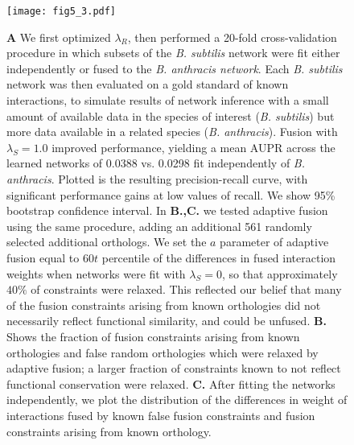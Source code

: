 \documentclass[11pt]{article}
\begin{document}
\pagebreak

\begin{figure}
\begin{center}
  \texttt{[image: fig5\_3.pdf]}
  \caption{\label{xspecies-real} \textbf{A} We first optimized $\lambda_R$, then performed a 20-fold cross-validation procedure in which subsets of the \textit{B. subtilis} network were fit either independently or fused to the \textit{B. anthracis network}. Each \textit{B. subtilis} network was then evaluated on a gold standard of known interactions, to simulate results of network inference with a small amount of available data in the species of interest (\textit{B. subtilis}) but more data available in a related species (\textit{B. anthracis}). Fusion with $\lambda_S=1.0$ improved performance, yielding a mean AUPR across the learned networks of 0.0388 vs. 0.0298 fit independently of  \textit{B. anthracis}. Plotted is the resulting precision-recall curve, with significant performance gains at low values of recall. We show 95\% bootstrap confidence interval. In \textbf{B.,C.} we tested adaptive fusion using the same procedure, adding an additional 561 randomly selected additional orthologs. We set the $a$ parameter of adaptive fusion equal to $60t$ percentile of the differences in fused interaction weights when networks were fit with $\lambda_S=0$, so that approximately $40\%$ of constraints were relaxed. This reflected our belief that many of the fusion constraints arising from known orthologies did not necessarily reflect functional similarity, and could be unfused. \textbf{B.} Shows the fraction of fusion constraints arising from known orthologies and false random orthologies which were relaxed by adaptive fusion; a larger fraction of constraints known to not reflect functional conservation were relaxed. \textbf{C.} After fitting the networks independently, we plot the distribution of the differences in weight of interactions fused by known false fusion constraints and fusion constraints arising from known orthology.}
\end{center}
\end{figure}
\pagebreak
\end{document}
